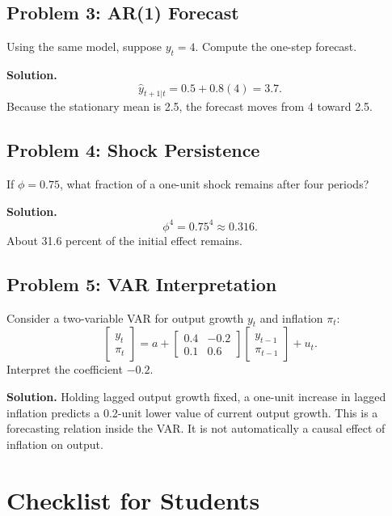 \subsection*{Problem 3: AR(1) Forecast}

Using the same model, suppose \(y_t=4\). Compute the one-step forecast.

\textbf{Solution.}
\[
    \widehat{y}_{t+1|t}=0.5+0.8(4)=3.7.
\]
Because the stationary mean is 2.5, the forecast moves from 4 toward 2.5.

\subsection*{Problem 4: Shock Persistence}

If \(\phi=0.75\), what fraction of a one-unit shock remains after four periods?

\textbf{Solution.}
\[
    \phi^4=0.75^4\approx 0.316.
\]
About 31.6 percent of the initial effect remains.

\subsection*{Problem 5: VAR Interpretation}

Consider a two-variable VAR for output growth \(y_t\) and inflation \(\pi_t\):
\[
\begin{bmatrix}
y_t\\ \pi_t
\end{bmatrix}
=
a+
\begin{bmatrix}
0.4 & -0.2\\
0.1 & 0.6
\end{bmatrix}
\begin{bmatrix}
y_{t-1}\\ \pi_{t-1}
\end{bmatrix}
+u_t.
\]
Interpret the coefficient \(-0.2\).

\textbf{Solution.} Holding lagged output growth fixed, a one-unit increase in lagged inflation predicts a 0.2-unit lower value of current output growth. This is a forecasting relation inside the VAR. It is not automatically a causal effect of inflation on output.

\section{Checklist for Students}

